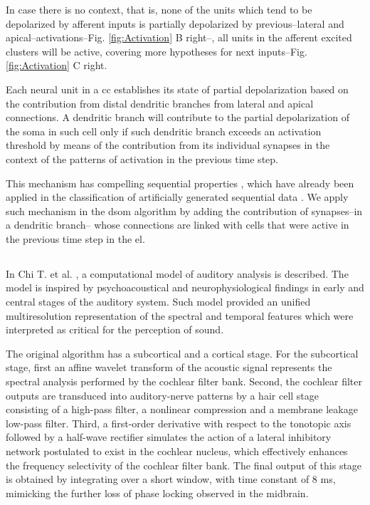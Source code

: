 \documentclass[11pt,a4paper]{article}
\begin{document}
In case there is no context, that is, none of the units which tend to be depolarized by afferent inputs
is partially depolarized by previous--lateral and apical--activations--Fig. \ref{fig:Activation} B right--,
all units in the afferent excited clusters will be active, covering more hypotheses for next inputs--Fig. \ref{fig:Activation} C right.

Each neural unit in a \gls{cc} establishes its state of partial depolarization based on the contribution from
distal dendritic branches from lateral and apical connections.
A dendritic branch will contribute to the partial depolarization of the soma in such cell only if such
dendritic branch exceeds an activation threshold by means of the contribution from its individual synapses
in the context of the patterns of activation in the previous time step.

This mechanism has compelling sequential properties \cite{hawkins_2016},
which have already been applied in the classification of artificially generated sequential data \cite{cui_2016}.
We apply such mechanism in the \gls{dsom} algorithm by adding the contribution of synapses--in a dendritic branch--
whose connections are linked with cells that were active in the previous time step in the \gls{el}.

















\subsection*{}
\label{sec-mrstsa}

In Chi T. et al. \cite{chi_2005}, a computational model of auditory analysis is described.
The model is inspired by psychoacoustical and
neurophysiological findings in early and central stages of the auditory system.
Such model provided
an unified multiresolution representation of the spectral and temporal features
which were interpreted as critical for the perception of sound.

The original algorithm has a subcortical and a cortical stage.
For the subcortical stage, first an affine wavelet transform of the acoustic signal
represents the spectral analysis performed by the cochlear filter bank.
Second, the cochlear filter outputs are transduced into auditory-nerve
patterns by a hair cell stage consisting of a high-pass filter,
a nonlinear compression and a membrane leakage low-pass filter.
Third, a first-order derivative with respect to the tonotopic axis
followed by a half-wave rectifier
simulates the action of a lateral inhibitory
network postulated to exist in the cochlear nucleus,
which effectively enhances the frequency
selectivity of the cochlear filter bank.
The final output of this stage is obtained by integrating
over a short window, with time constant of 8 ms, mimicking
the further loss of phase locking observed
in the midbrain.
\end{document}
